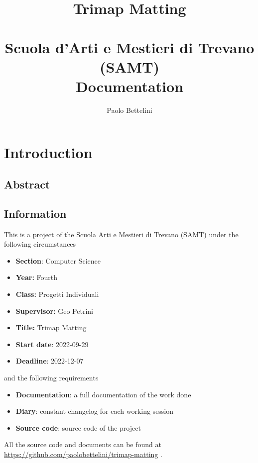 \documentclass[a4paper]{article}
\title{%
    Trimap Matting \\
    \phantom{} \\
    \large Scuola d'Arti e Mestieri di Trevano (SAMT) \\
    \large Documentation
}
\author{Paolo Bettelini}
\date{}
\begin{document}
\maketitle

\pagebreak


\tableofcontents

\pagebreak

\section{Introduction}

\subsection{Abstract}

\subsection{Information}


This is a project of the Scuola Arti e Mestieri di Trevano (SAMT) under the following circumstances

\begin{itemize}
    \item \textbf{Section}: Computer Science
    \item \textbf{Year:} Fourth
    \item \textbf{Class:} Progetti Individuali
    \item \textbf{Supervisor:} Geo Petrini
    \item \textbf{Title:} Trimap Matting
    \item \textbf{Start date}: 2022-09-29
    \item \textbf{Deadline}: 2022-12-07
\end{itemize}

and the following requirements

\begin{itemize}
    \item \textbf{Documentation}: a full documentation of the work done
    \item \textbf{Diary}: constant changelog for each working session
    \item \textbf{Source code}: source code of the project
\end{itemize}

All the source code and documents can be found at
\href{https://github.com/paolobettelini/trimap-matting}
{https://github.com/paolobettelini/trimap-matting}
\cite{gitrepo}.
\end{document}
